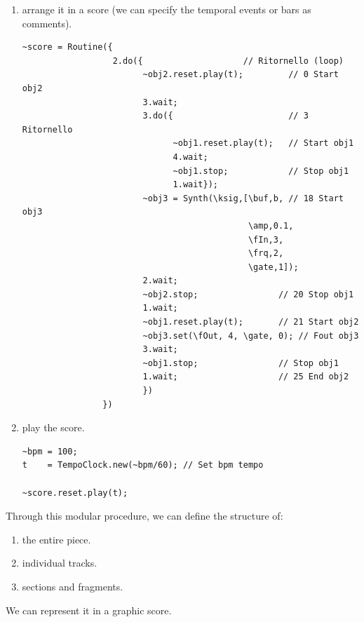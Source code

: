 \begin{itemize}
\begin{enumerate}
\item arrange it in a score (we can specify the temporal events or bars as comments).
\begin{lstlisting}[frame=single] 
~score = Routine({
                  2.do({                    // Ritornello (loop)
                        ~obj2.reset.play(t);         // 0 Start obj2
                        3.wait;
                        3.do({                       // 3 Ritornello 
                              ~obj1.reset.play(t);   // Start obj1
                              4.wait;
                              ~obj1.stop;            // Stop obj1
                              1.wait});
                        ~obj3 = Synth(\ksig,[\buf,b, // 18 Start obj3
                                             \amp,0.1,
                                             \fIn,3,
                                             \frq,2,
                                             \gate,1]); 
                        2.wait;
                        ~obj2.stop;                // 20 Stop obj1
                        1.wait;
                        ~obj1.reset.play(t);       // 21 Start obj2
                        ~obj3.set(\fOut, 4, \gate, 0); // Fout obj3
                        3.wait;
                        ~obj1.stop;                // Stop obj1
                        1.wait;                    // 25 End obj2                                        
                        })
                })
\end{lstlisting}

\item play the score.
\begin{lstlisting}[frame=single, caption=Scoring] 
~bpm = 100;                         
t    = TempoClock.new(~bpm/60); // Set bpm tempo

~score.reset.play(t);
\end{lstlisting}
\end{enumerate}
\end{itemize}

Through this modular procedure, we can define the structure of: 
    
\begin{enumerate}
\tightlist
\item the entire piece. 
\item individual tracks. 
\item sections and fragments.
\end{enumerate} 

We can represent it in a graphic score.

